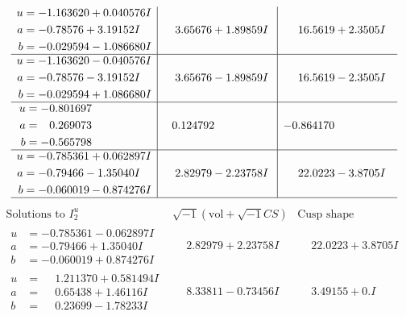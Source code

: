 \documentclass[1p]{elsarticle_modified}
\theoremstyle{definition}
\newcommand{\I}{\sqrt{-1}}
\begin{document}
$$\begin{array}{c|c|c}
\begin{aligned}
u &= -1.163620 + 0.040576 I \\
a &= -0.78576 + 3.19152 I \\
b &= -0.029594 - 1.086680 I\end{aligned}
 & \phantom{-}3.65676 + 1.89859 I & \phantom{-}16.5619 + 2.3505 I \\ \hline\begin{aligned}
u &= -1.163620 - 0.040576 I \\
a &= -0.78576 - 3.19152 I \\
b &= -0.029594 + 1.086680 I\end{aligned}
 & \phantom{-}3.65676 - 1.89859 I & \phantom{-}16.5619 - 2.3505 I \\ \hline\begin{aligned}
u &= -0.801697\phantom{ +0.000000I} \\
a &= \phantom{-}0.269073\phantom{ +0.000000I} \\
b &= -0.565798\phantom{ +0.000000I}\end{aligned}
 & \phantom{-}0.124792\phantom{ +0.000000I} & -0.864170\phantom{ +0.000000I} \\ \hline\begin{aligned}
u &= -0.785361 + 0.062897 I \\
a &= -0.79466 - 1.35040 I \\
b &= -0.060019 - 0.874276 I\end{aligned}
 & \phantom{-}2.82979 - 2.23758 I & \phantom{-}22.0223 - 3.8705 I\\
 \hline 
 \end{array}$$\newpage$$\begin{array}{c|c|c}  
\text{Solutions to }I^u_{2}& \I (\text{vol} + \sqrt{-1}CS) & \text{Cusp shape}\\
 \hline 
\begin{aligned}
u &= -0.785361 - 0.062897 I \\
a &= -0.79466 + 1.35040 I \\
b &= -0.060019 + 0.874276 I\end{aligned}
 & \phantom{-}2.82979 + 2.23758 I & \phantom{-}22.0223 + 3.8705 I \\ \hline\begin{aligned}
u &= \phantom{-}1.211370 + 0.581494 I \\
a &= \phantom{-}0.65438 + 1.46116 I \\
b &= \phantom{-}0.23699 - 1.78233 I\end{aligned}
 & \phantom{-}8.33811 - 0.73456 I & \phantom{-}3.49155 + 0. I\phantom{ +0.000000I} \\ \hline\begin{aligned}

\end{aligned}
\end{array}$$
\end{document}
